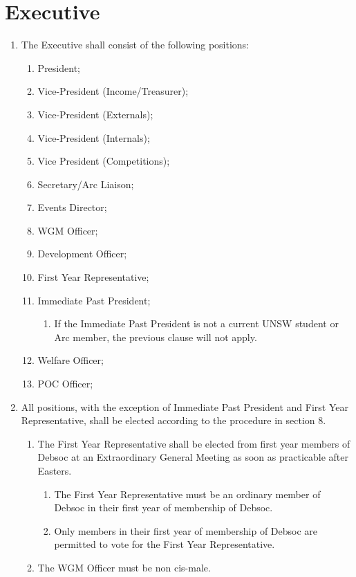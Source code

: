 \newpage
\section{Executive}
\begin{enumerate}
\item The Executive shall consist of the following positions: \label{exec_positions}
  \begin{enumerate}
  \item President;
  \item Vice-President (Income/Treasurer);
  \item Vice-President (Externals);
  \item Vice-President (Internals);
  \item Vice President (Competitions);
  \item Secretary/Arc Liaison;
  \item Events Director;
  \item WGM Officer;
  \item Development Officer;
  \item First Year Representative;
  \item Immediate Past President;
    \begin{enumerate}
    \item If the Immediate Past President is not a current UNSW student or Arc member, the previous clause will not apply.
    \end{enumerate}
  \item Welfare Officer;
  \item POC Officer;
  \end{enumerate}
\item All positions, with the exception of Immediate Past President and First Year Representative, shall be elected according to the procedure in section 8.
  \begin{enumerate}
  \item The First Year Representative shall be elected from first year members of Debsoc at an Extraordinary General Meeting as soon as practicable after Easters.
    \begin{enumerate}
    \item The First Year Representative must be an ordinary member of Debsoc in their first year of membership of Debsoc.
    \item Only members in their first year of membership of Debsoc are permitted to vote for the First Year Representative.
    \end{enumerate}
  \item The WGM Officer must be non cis-male.

\end{enumerate}
\end{enumerate}
